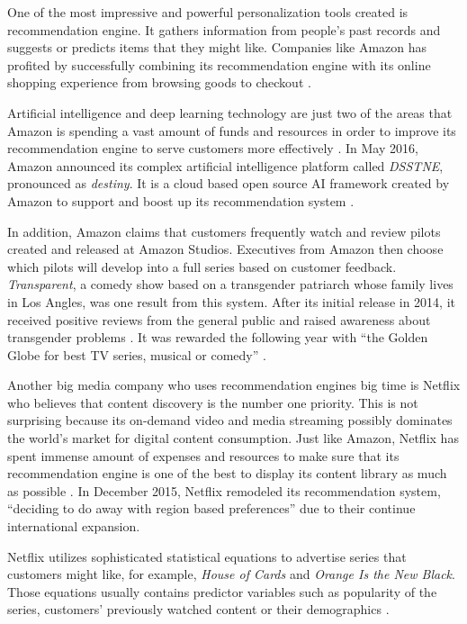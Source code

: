 One of the most impressive and powerful personalization tools created is recommendation engine. It gathers information from people's past records and suggests or predicts items that they might like. Companies like Amazon has profited by successfully combining its recommendation engine with its online shopping experience from browsing goods to checkout \cite{Arora2016battle}.  

Artificial intelligence and deep learning technology are just two of the areas that Amazon is spending a vast amount of funds and resources in order to improve its recommendation engine to serve customers more effectively \cite{Arora2016battle}. In May 2016, Amazon announced its complex artificial intelligence platform called {\em DSSTNE}, pronounced as {\em destiny}. It is a cloud based open source AI framework created by Amazon to support and boost up its recommendation system \cite{Arora2016battle}.

In addition, Amazon claims that customers frequently watch and review pilots created and released at Amazon Studios. Executives from Amazon then choose which pilots will develop into a full series based on customer feedback. {\em Transparent}, a comedy show based on a transgender patriarch whose family lives in Los Angles, was one result from this system. After its initial release in 2014, it received positive reviews from the general public and raised awareness about transgender problems \cite{Whitley2016data}. It was rewarded the following year with ``the Golden Globe for best TV series, musical or comedy'' \cite{Whitley2016data}.

Another big media company who uses recommendation engines big time is Netflix who believes that content discovery is the number one priority. This is not surprising because its on-demand video and media streaming possibly dominates the world's market for digital content consumption. Just like Amazon, Netflix has spent immense amount of expenses and resources to make sure that its recommendation engine is one of the best to display its content library as much as possible \cite{Arora2016battle}. In December 2015, Netflix remodeled its recommendation system, ``deciding to do away with region based preferences'' \cite{Arora2016battle} due to their continue international expansion. 

Netflix utilizes sophisticated statistical equations to advertise series that customers might like, for example, {\em House of Cards} and {\em Orange Is the New Black}. Those equations usually contains predictor variables such as popularity of the series, customers' previously watched content or their demographics \cite{Whitley2016data}.

